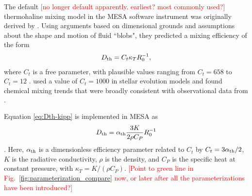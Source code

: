 The default \textcolor{red}{[no longer default apparently. earliest? most commonly used?]} thermohaline mixing model in the MESA software instrument \citep{mesa2} was originally derived by \citet{ulrich_1972, kippenhahn_etal_1980}.
Using arguments based on dimensional grounds and assumptions about the shape and motion of fluid ``blobs", they predicted a mixing efficiency of the form
\begin{equation} \label{eq:Dth-kipp}
    \Dth = C_t \kappa_T R_0^{-1},
\end{equation}
\citep[see Eq.~(5) of][]{charbonnel_thermohaline_2007}
where $C_t$ is a free parameter, with plausible values ranging from $C_t = 658$ \citep{ulrich_1972} to $C_t = 12$ \citep{kippenhahn_etal_1980}. 
\citet{charbonnel_thermohaline_2007} used a value of $C_t = 1000$ in stellar evolution models and found chemical mixing trends that were broadly consistent with observational data from \citet{Gratton2000}.

Equation \eqref{eq:Dth-kipp} is implemented in MESA as
\begin{equation} \label{eq:Dth-kipp-MESA}
    \Dth = \alpha_{\rm{th}} \frac{3 K}{2\rho C_P}R_0^{-1}
\end{equation}
\citep[see Eq.~(14) of][]{mesa2}. 
Here, $\alpha_{\rm{th}}$ is a dimensionless efficiency parameter related to $C_t$ by $C_t = 3\alpha_{\rm{th}}/2$, $K$ is the radiative conductivity, $\rho$ is the density, and $C_P$ is the specific heat at constant pressure, with $\kappa_T = K/(\rho C_P)$. 
\textcolor{red}{[Point to green line in Fig.~\ref{fig:parameterization_compare} now, or later after all the parameterizations have been introduced?]}


